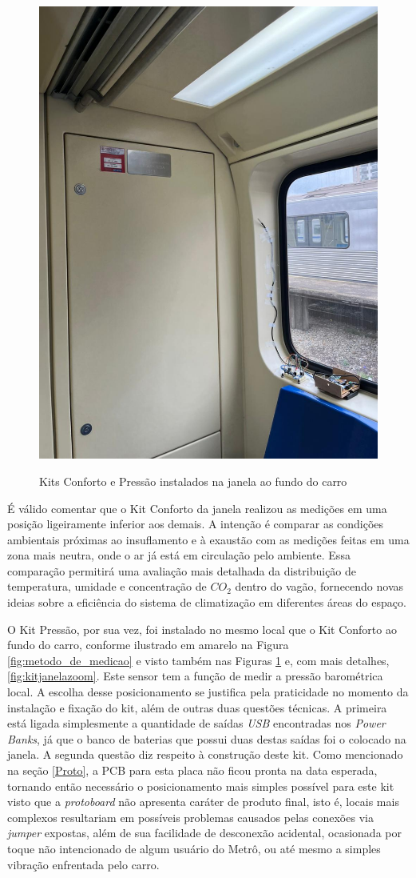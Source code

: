 \documentclass[acronym,symbols,table]{fei}
\begin{document}
\begin{figure}[!htb]
\centering
    \caption{Kits Conforto e Pressão instalados na janela ao fundo do carro}
    \includegraphics[width=0.50\linewidth]{Imagens/kitjanela.jpeg}
    \label{fig:kitjanela}
\end{figure}
\newpage

É válido comentar que o Kit Conforto da janela realizou as medições em uma posição ligeiramente inferior aos demais. A intenção é comparar as condições ambientais próximas ao insuflamento e à exaustão com as medições feitas em uma zona mais neutra, onde o ar já está em circulação pelo ambiente. Essa comparação permitirá uma avaliação mais detalhada da distribuição de temperatura, umidade e concentração de ${CO}_{2}$ dentro do vagão, fornecendo novas ideias sobre a eficiência do sistema de climatização em diferentes áreas do espaço.

O Kit Pressão, por sua vez, foi instalado no mesmo local que o Kit Conforto ao fundo do carro, conforme ilustrado em amarelo na Figura \ref{fig:metodo_de_medicao} e visto também nas Figuras \ref{fig:kitjanela} e, com mais detalhes, \ref{fig:kitjanelazoom}. Este sensor tem a função de medir a pressão barométrica local. A escolha desse posicionamento se justifica pela praticidade no momento da instalação e fixação do kit, além de outras duas questões técnicas. A primeira está ligada simplesmente a quantidade de saídas \textit{USB} encontradas nos \textit{Power Banks}, já que o banco de baterias que possui duas destas saídas foi o colocado na janela. A segunda questão diz respeito à construção deste kit. Como mencionado na seção \ref{Proto}, a PCB para esta placa não ficou pronta na data esperada, tornando então necessário o posicionamento mais simples possível para este kit visto que a \textit{protoboard} não apresenta caráter de produto final, isto é, locais mais complexos resultariam em possíveis problemas causados pelas conexões via \textit{jumper} expostas, além de sua facilidade de desconexão acidental, ocasionada por toque não intencionado de algum usuário do Metrô, ou até mesmo a simples vibração enfrentada pelo carro.
\end{document}
